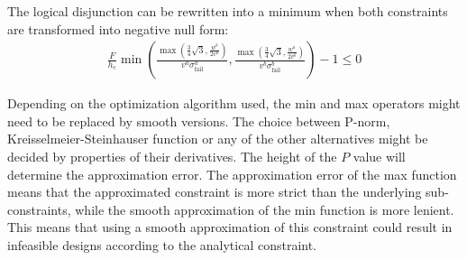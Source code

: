 The logical disjunction can be rewritten into a minimum when both constraints are transformed into negative null form:
\begin{align*}
	\frac{F}{h_\text{c}}  \min{\left( \frac{ \max{\left( \frac34 \sqrt{3}, \frac{w^b}{2v^a} \right)} }{ v^a \sigma^a_\text{fail} }  
		, \frac{ \max{\left( \frac34 \sqrt{3}, \frac{w^a}{2v^b} \right)} }{ v^b \sigma^b_\text{fail} }   \right)} - 1 \le 0  
\end{align*}

Depending on the optimization algorithm used, the min and max operators might need to be replaced by smooth versions.
The choice between P-norm, Kreisselmeier-Steinhauser function or any of the other alternatives might be decided by properties of their derivatives.
The height of the $P$ value will determine the approximation error.
The approximation error of the max function means that the approximated constraint is more strict than the underlying sub-constraints, 
while the smooth approximation of the min function is more lenient.
This means that using a smooth approximation of this constraint could result in infeasible designs according to the analytical constraint.




